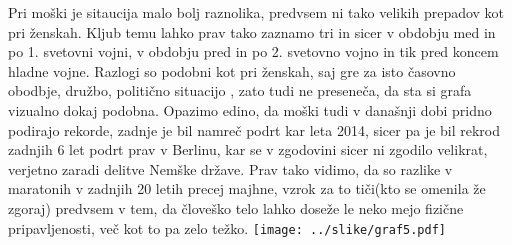 \documentclass[11pt,a4paper]{article}
\begin{document}
Pri moški je sitaucija malo bolj raznolika, predvsem ni tako velikih prepadov kot pri ženskah. Kljub temu lahko prav tako zaznamo tri in sicer v obdobju med in po 1. svetovni vojni, v obdobju pred in po 2. svetovno vojno in tik pred koncem hladne vojne. Razlogi so podobni kot pri ženskah, saj gre za isto časovno obodbje, družbo, politično situacijo , zato tudi ne preseneča, da sta si grafa vizualno dokaj podobna. Opazimo edino, da moški tudi v današnji dobi pridno podirajo rekorde, zadnje je bil namreč podrt kar leta 2014, sicer pa je bil rekrod zadnjih 6 let podrt prav v Berlinu, kar se v zgodovini sicer ni zgodilo velikrat, verjetno zaradi delitve Nemške države.
Prav tako vidimo, da so razlike v maratonih v zadnjih 20 letih precej majhne, vzrok za to tiči(kto se omenila že zgoraj) predvsem v tem, da človeško telo lahko doseže le neko mejo fizične pripavljenosti, več kot to pa zelo težko.
\texttt{[image: ../slike/graf5.pdf]}
\end{document}
